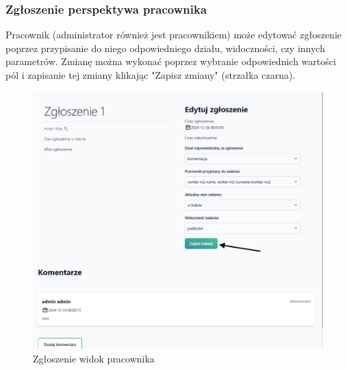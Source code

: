 \subsubsection{Zgłoszenie perspektywa pracownika}
Pracownik (administrator również jest pracownikiem) może edytować zgłoszenie poprzez przypisanie do niego odpowiedniego działu, widoczności, czy innych parametrów. Zmianę można wykonać poprzez wybranie odpowiednich wartości pól i zapisanie tej zmiany klikając "Zapisz zmiany" (strzałka czarna).
\begin{figure}[H]
    \centering
    \includegraphics[width=0.75\linewidth]{img/request_worker.png}
    \caption{Zgłoszenie widok pracownika}
    \label{fig:enter-label}
\end{figure}
